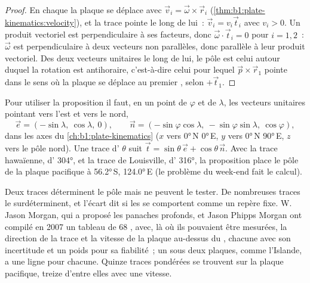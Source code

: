 \begin{proof}
En chaque  la plaque se déplace avec $\vec v_i = \vec\omega\times\vec r_i$
(\cref{thm:b1:plate-kinematics:velocity}), et la trace pointe le long de lui~:
$\vec v_i = v_i\vec t_i$ avec $v_i > 0$. Un produit vectoriel est perpendiculaire à ses
facteurs, donc $\vec\omega\cdot\vec t_i = 0$ pour $i = 1, 2$~: $\vec\omega$ est
perpendiculaire à deux vecteurs non parallèles, donc parallèle à leur
produit vectoriel. Des deux vecteurs unitaires le long de lui, le pôle est celui autour
duquel la rotation est antihoraire, c'est-à-dire celui pour lequel
$\vec p\times\vec r_1$ pointe dans le sens où la plaque se déplace au premier ,
selon $+\vec t_1$.
\end{proof}

Pour utiliser la proposition il faut, en un point de  $\varphi$ et de 
$\lambda$, les vecteurs unitaires pointant vers l'est et vers le nord,
\[
  \vec e = (-\sin\lambda,\ \cos\lambda,\ 0),\qquad
  \vec n = (-\sin\varphi\cos\lambda,\ -\sin\varphi\sin\lambda,\ \cos\varphi),
\]
dans les axes du \cref{ch:b1:plate-kinematics} ($x$ vers \ang{0}\,N
\ang{0}\,E, $y$ vers \ang{0}\,N \ang{90}\,E, $z$ vers le pôle nord). Une
trace d' $\theta$ suit $\vec t = \sin\theta\,\vec e +
\cos\theta\,\vec n$. Avec la trace hawaïenne, d' \ang{304}, et la trace
de Louisville, d' \ang{316}, la proposition place le pôle de la plaque
pacifique à \ang{56.2}\,S, \ang{124.0}\,E (le problème du week-end fait le
calcul).

Deux traces déterminent le pôle mais ne peuvent le tester. De nombreuses traces le
surdéterminent, et l'écart dit si les  se comportent comme un repère fixe. W. Jason
Morgan, qui a proposé les panaches profonds, et Jason Phipps Morgan ont compilé en 2007
un tableau de 68 , avec, là où ils pouvaient être mesurées, la direction de
la trace et la vitesse de la plaque au-dessus du , chacune avec son
incertitude et un poids pour sa fiabilité~; un  sous deux plaques, comme
l'Islande, a une ligne pour chacune. Quinze traces pondérées se trouvent sur la plaque
pacifique, treize d'entre elles avec une vitesse.

